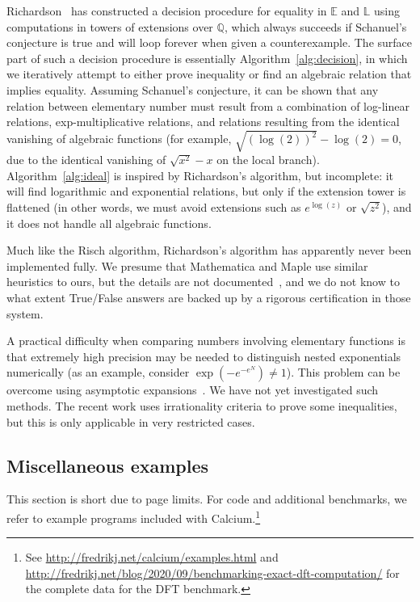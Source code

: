 \documentclass[sigconf,screen,urlbreakonhyphens]{acmart}
\begin{document}
Richardson~\cite{RF1994, Ric1992, Ric1995, Ric1997, Ric2007, Ric2009} has
constructed a decision procedure for equality in $\mathbb{E}$ and $\mathbb{L}$
using computations in towers of extensions over $\mathbb{Q}$,
which always succeeds
if Schanuel's conjecture is true
and will loop forever when given a counterexample.
The surface part of such a decision procedure is essentially Algorithm~\ref{alg:decision},
in which we iteratively attempt to either prove inequality
or find an algebraic relation that implies equality.
Assuming Schanuel's conjecture, it can be shown that any relation between
elementary number must result from a combination of
log-linear relations, exp-multiplicative relations,
and relations resulting from the identical
vanishing of algebraic functions (for example, $\sqrt{(\log(2))^2} - \log(2) = 0$,
due to the identical vanishing of $\sqrt{x^2}-x$ on the local branch).
Algorithm~\ref{alg:ideal} is inspired by Richardson's algorithm,
but incomplete: it will find logarithmic and exponential
relations, but only
if the extension tower is flattened
(in other words, we must avoid
extensions such as $e^{\log(z)}$ or $\sqrt{z^2}$),
and it does not handle all algebraic functions.

Much like the Risch algorithm,
Richardson's algorithm has apparently never been implemented fully.
We presume that Mathematica and Maple use similar
heuristics to ours, but the details
are not documented~\cite{Car2020}, and we do not know to what
extent True/False answers are backed up by a rigorous certification
in those system.

A practical difficulty when comparing numbers involving
elementary functions
is that extremely high precision may be needed
to distinguish nested exponentials numerically (as an
example, consider $\exp(-e^{-e^{N}}) \ne 1$).
This problem can be overcome using asymptotic expansions~\cite{vdH1995}.
We have not yet investigated such methods.
The recent work \cite{Boe2020} uses irrationality criteria
to prove some inequalities,
but this is only applicable in very restricted cases.

\subsection{Miscellaneous examples}

This section is short due to page limits.
For code and additional benchmarks, we refer to
example programs included with Calcium.\footnote{See \url{http://fredrikj.net/calcium/examples.html}
and \url{http://fredrikj.net/blog/2020/09/benchmarking-exact-dft-computation/} for the complete data for the DFT benchmark.}
\end{document}
